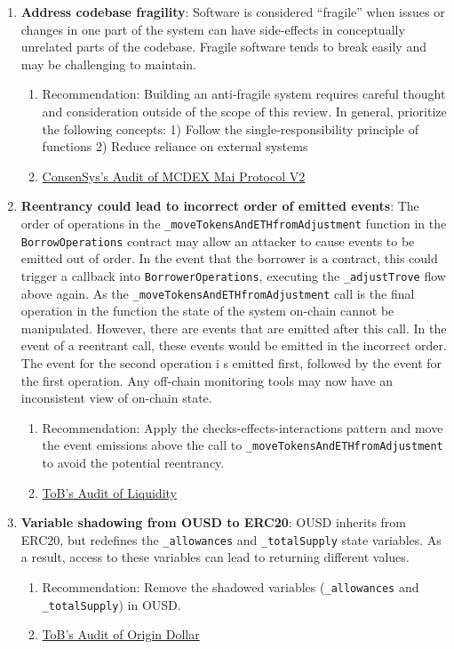 \begin{enumerate}
\item\textbf{Address codebase fragility}: Software is considered “fragile” when issues or changes in one part of the system can have side-effects in conceptually unrelated parts of the codebase. Fragile software tends to break easily and may be challenging to maintain.
	\begin{enumerate}
	\item Recommendation: Building an anti-fragile system requires careful thought and consideration outside of the scope of this review. In general, prioritize the following concepts: 1) Follow the single-responsibility principle of functions 2) Reduce reliance on external systems
	\item\href{https://consensys.net/diligence/audits/2020/05/mcdex-mai-protocol-v2/\#address-codebase-fragility}{ConsenSys's Audit of MCDEX Mai Protocol V2}
	\end{enumerate}

\item\textbf{Reentrancy could lead to incorrect order of emitted events}: The order of operations in the \verb|_moveTokensAndETHfromAdjustment| function in the \verb|BorrowOperations| contract may allow an attacker to cause events to be emitted out of order. In the event that the borrower is a contract, this could trigger a callback into \verb|BorrowerOperations|, executing the \verb|_adjustTrove| flow above again. As the \verb|_moveTokensAndETHfromAdjustment| call is the final operation in the function the state of the system on-chain cannot be manipulated. However, there are events that are emitted after this call. In the event of a reentrant call, these events would be emitted in the incorrect order. The event for the second operation i s emitted first, followed by the event for the first operation. Any off-chain monitoring tools may now have an inconsistent view of on-chain state.
	\begin{enumerate}
	\item Recommendation: Apply the checks-effects-interactions pattern and move the event emissions above the call to \verb|_moveTokensAndETHfromAdjustment| to avoid the potential reentrancy.
	\item\href{https://github.com/trailofbits/publications/blob/master/reviews/Liquity.pdf}{ToB's Audit of Liquidity}
	\end{enumerate}

\item\textbf{Variable shadowing from OUSD to ERC20}: OUSD inherits from ERC20, but redefines the \verb|_allowances| and \verb|_totalSupply| state variables. As a result, access to these variables can lead to returning different values.
	\begin{enumerate}
	\item Recommendation: Remove the shadowed variables (\verb|_allowances| and \verb|_totalSupply|) in OUSD.
	\item\href{https://github.com/trailofbits/publications/blob/master/reviews/OriginDollar.pdf}{ToB's Audit of Origin Dollar}
	\end{enumerate}


\end{enumerate}
